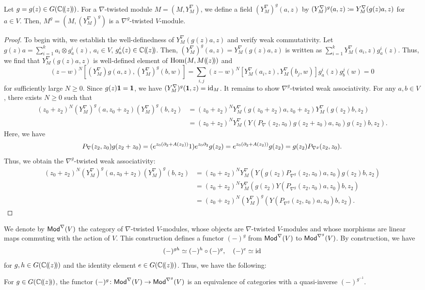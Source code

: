 \documentclass[final,reqno]{amsart}
\begin{document}
\begin{thm}\label{thm:gauge transf}
    Let $g=g(z)\in G(\mathbb{C}(\!( z )\!))$. For a $\nabla$-twisted module $M=(M,Y^\nabla_M)$, we define a field $(Y^\nabla_M)^g(a,z)$ by $(Y^\nabla_M)^g(a,z)\coloneqq Y^\nabla_M(g(z)a,z)$ for $a\in V$. Then, $M^g=(M,(Y^\nabla_M)^g)$ is a $\nabla^g$-twisted $V$-module.
\end{thm}

\begin{proof}
    To begin with, we establish the well-definedness of $Y^\nabla_M(g(z)a,z)$ and verify weak commutativity. Let $g(z)a=\sum_{i=1}^ka_i\otimes g^i_a(z)$, $a_i\in V$, $g_a^i(z)\in\mathbb{C}(\!( z )\!)$. Then, $(Y^\nabla_M)^g(a,z)=Y^\nabla_M(g(z)a,z)$ is written as $\sum_{i=1}^kY^\nabla_M(a_i,z)g^i_a(z)$. Thus, we find that $Y^\nabla_M(g(z)a,z)$ is well-defined element of $\operatorname{Hom}(M,M(\!( z )\!))$ and 
    \[
        (z-w)^N[(Y^\nabla_M)g(a,z),(Y^\nabla_M)^g(b,w)]=\sum_{i,j}(z-w)^N[Y^\nabla_M(a_i,z),Y^\nabla_M(b_j,w)]g^i_a(z)g^j_b(w)=0
    \]
    for sufficiently large $N\geq 0$. Since $g(z)\mathbf{1}=\mathbf{1}$, we have $(Y^\nabla_M)^g(\mathbf{1},z)=\operatorname{id}_M$. It remains to show $\nabla^g$-twisted weak associativity. For any $a,b\in V$, there exists $N\geq 0$ such that
    \begin{align*}
        (z_0+z_2)^N(Y^\nabla_M)^g(a,z_0+z_2)(Y^\nabla_M)^g(b,z_2)
        &=(z_0+z_2)^NY^\nabla_M(g(z_0+z_2)a,z_0+z_2)Y^\nabla_M(g(z_2)b,z_2)\\
        &=(z_0+z_2)^NY^\nabla_M(Y(P_\nabla(z_2,z_0)g(z_2+z_0)a,z_0)g(z_2)b,z_2).
    \end{align*}
    Here, we have
    \[
        P_\nabla(z_2,z_0)g(z_2+z_0)=(e^{z_0(\partial_2+A(z_2))}1)e^{z_0\partial_2}g(z_2)=e^{z_0(\partial_2+A(z_2))}g(z_2)=g(z_2)P_{\nabla^g}(z_2,z_0).
    \]
    Thus, we obtain the $\nabla^g$-twisted weak associativity:
    \begin{align*}
        (z_0+z_2)^N(Y^\nabla_M)^g(a,z_0+z_2)(Y^\nabla_M)^g(b,z_2)
        &=(z_0+z_2)^NY^{\nabla}_M(Y(g(z_2)P_{\nabla^g}(z_2,z_0)a,z_0)g(z_2)b,z_2)\\
        &=(z_0+z_2)^NY^{\nabla}_M(g(z_2)Y(P_{\nabla^g}(z_2,z_0)a,z_0)b,z_2)\\
        &=(z_0+z_2)^N(Y^\nabla_M)^g(Y(P_{\nabla^g}(z_2,z_0)a,z_0)b,z_2).
    \end{align*}
\end{proof}

We denote by $\mathsf{Mod}^\nabla(V)$ the category of $\nabla$-twisted $V$-modules, whose objects are $\nabla$-twisted $V$-modules and whose morphisms are linear maps commuting with the action of $V$. This construction defines a functor $(-)^g$ from $\mathsf{Mod}^\nabla(V)$ to $\mathsf{Mod}^{\nabla^g}(V)$. By construction, we have
\[
    (-)^{gh}\simeq (-)^{h}\circ (-)^{g},\quad (-)^{e}\simeq\operatorname{id}
\]
for $g,h\in G(\mathbb{C}(\!( z )\!))$ and the identity element $e\in G(\mathbb{C}(\!( z )\!))$. Thus, we have the following:
\begin{cor}\label{cor:main A}
    For $g\in G(\mathbb{C}(\!( z )\!))$, the functor $(-)^g\colon\mathsf{Mod}^\nabla(V)\to \mathsf{Mod}^{\nabla^g}(V)$ is an equivalence of categories with a quasi-inverse $(-)^{g^{-1}}$.
\end{cor}
\end{document}
